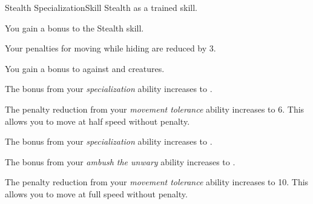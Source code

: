     \begin{feat}{Stealth Specialization}{Skill}
        \featpre Stealth as a trained skill.

         You gain a  bonus to the Stealth skill.

         Your penalties for moving while hiding are reduced by 3.

         You gain a  bonus to  against \unaware and \partiallyunaware creatures.

         The bonus from your \textit{specialization} ability increases to .

         The penalty reduction from your \textit{movement tolerance} ability increases to 6.
        This allows you to move at half speed without penalty.

         The bonus from your \textit{specialization} ability increases to .

         The bonus from your \textit{ambush the unwary} ability increases to .

         The penalty reduction from your \textit{movement tolerance} ability increases to 10.
        This allows you to move at full speed without penalty.
    \end{feat}


